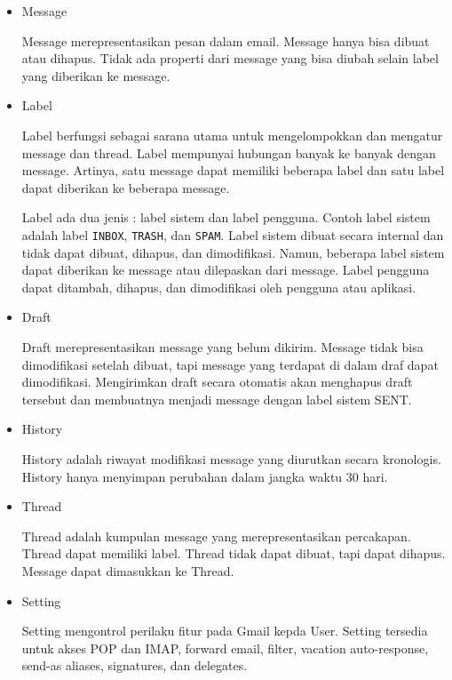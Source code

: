 \begin{itemize}
\item Message

Message merepresentasikan pesan dalam email. Message hanya bisa dibuat atau dihapus. Tidak ada properti dari message yang bisa diubah selain label yang diberikan ke message.

\item Label

Label berfungsi sebagai sarana utama untuk mengelompokkan dan mengatur message dan thread. Label mempunyai hubungan banyak ke banyak dengan message. Artinya, satu message dapat memiliki beberapa label dan satu label dapat diberikan ke beberapa message.

Label ada dua jenis : label sistem dan label pengguna. Contoh label sistem adalah label \texttt{INBOX}, \texttt{TRASH}, dan \texttt{SPAM}. Label sistem dibuat secara internal dan tidak dapat dibuat, dihapus, dan dimodifikasi. Namun, beberapa label sistem dapat diberikan ke message atau dilepaskan dari message. Label pengguna dapat ditambah, dihapus, dan dimodifikasi oleh pengguna atau aplikasi.

\item Draft

Draft merepresentasikan message yang belum dikirim. Message tidak bisa dimodifikasi setelah dibuat, tapi message yang terdapat di dalam draf dapat dimodifikasi. Mengirimkan draft secara otomatis akan menghapus draft tersebut dan membuatnya menjadi message dengan label sistem SENT.

\item History

History adalah riwayat modifikasi message yang diurutkan secara kronologis. History hanya menyimpan perubahan dalam jangka waktu 30 hari.

\item Thread

Thread adalah kumpulan message yang merepresentasikan percakapan. Thread dapat memiliki label. Thread tidak dapat dibuat, tapi dapat dihapus. Message dapat dimasukkan ke Thread.

\item Setting

Setting mengontrol perilaku fitur pada Gmail kepda User. Setting tersedia untuk akses POP dan IMAP, forward email, filter, vacation auto-response, send-as aliases, signatures, dan delegates.

\end{itemize}  

